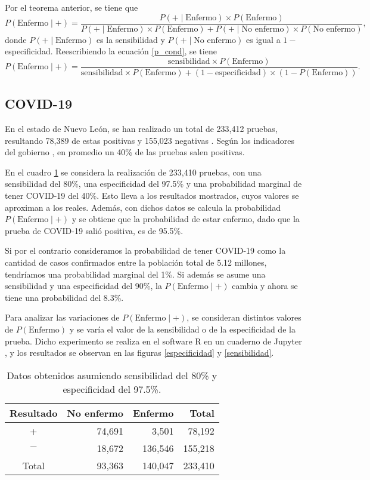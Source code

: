 \documentclass[12pt,letterpaper]{article}
\begin{document}
Por el teorema anterior, se tiene que
\begin{equation} \label{p_cond}
P(\text{Enfermo} \mid +) = \frac{P(+ \mid \text{Enfermo})\times P(\text{Enfermo})}{P(+\mid \text{Enfermo}) \times P(\text{Enfermo})+P(+\mid \text{No enfermo}) \times P(\text{No enfermo})},
\end{equation}
donde $P(+\mid \text{Enfermo})$ es la sensibilidad y $P(+\mid \text{No enfermo})$ es igual a $1-$especificidad. Reescribiendo la ecuación \ref{p_cond}, se tiene
\begin{equation}
P(\text{Enfermo} \mid +) = \frac{\text{sensibilidad} \times P(\text{Enfermo})}{\text{sensibilidad} \times P(\text{Enfermo})+(1-\text{especificidad})\times (1 - P(\text{Enfermo}))}.
\end{equation}

\subsection{COVID-19}
En el estado de Nuevo León, se han realizado un total de 233,412 pruebas, resultando 78,389 de estas positivas y 155,023 negativas \cite{nl}. Según los indicadores del gobierno \cite{indicadores_nl}, en promedio un 40\% de las pruebas salen positivas. 

En el cuadro \ref{cov1} se considera la realización de 233,410 pruebas, con una sensibilidad del 80\%, una especificidad del 97.5\% y una probabilidad marginal de tener COVID-19 del 40\%. Esto lleva a los resultados mostrados, cuyos valores se aproximan a los reales. Además, con dichos datos se calcula la probabilidad $P(\text{Enfermo} \mid +)$ y se obtiene que la probabilidad de estar enfermo, dado que la prueba de COVID-19 salió positiva, es de 95.5\%.

Si por el contrario consideramos la probabilidad de tener COVID-19 como la cantidad de casos confirmados entre la población total de 5.12 millones, tendríamos una probabilidad marginal del 1\%. Si además se asume una sensibilidad  y una especificidad del 90\%, la $P(\text{Enfermo} \mid +)$ cambia y ahora se tiene una probabilidad del 8.3\%.

Para analizar las variaciones de $P(\text{Enfermo} \mid +)$, se consideran distintos valores de $P(\text{Enfermo})$ y se varía el valor de la sensibilidad o de la especificidad de la prueba. Dicho experimento se realiza en el software R \cite{R} en un cuaderno de Jupyter \cite{jupyter}, y los resultados se observan en las figuras \ref{especificidad} y \ref{sensibilidad}.  
\begin{table}
\centering
\caption{Datos obtenidos asumiendo sensibilidad del 80\% y especificidad del 97.5\%.}
\begin{tabular}{|c|r|r|r|}
\hline 
Resultado & No enfermo & Enfermo & Total\\ 
\hline 
+ & 74,691 & 3,501 & 78,192  \\ 
\hline 
$-$ & 18,672 & 136,546 & 155,218\\ 
\hline 
Total & 93,363 & 140,047 & 233,410\\
\hline
\end{tabular} 
\label{cov1}
\end{table}
\end{document}
